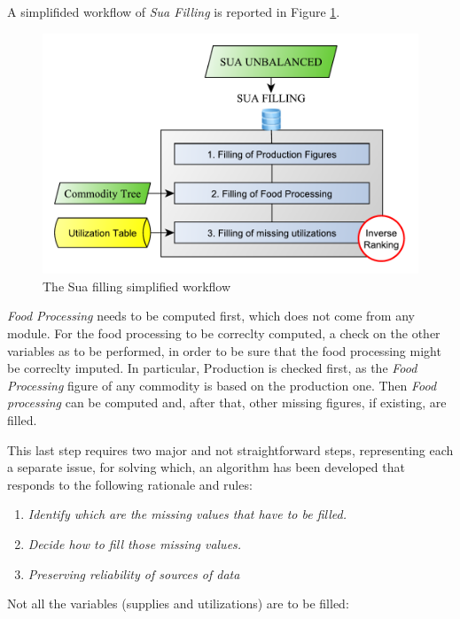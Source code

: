 \documentclass[]{article}
\providecommand{\tightlist}{%
  \setlength{\itemsep}{0pt}\setlength{\parskip}{0pt}}
\begin{document}
A simplifided workflow of \emph{Sua Filling} is reported in Figure
\ref{fig:f3}.

\begin{figure}[H]

{\centering \includegraphics[width=0.6\linewidth]{images/03_SuaFilling} 

}

\caption{\label{fig:f3}The Sua filling simplified workflow}\label{fig:f3}
\end{figure}

\emph{Food Processing} needs to be computed first, which does not come
from any module. For the food processing to be correclty computed, a
check on the other variables as to be performed, in order to be sure
that the food processing might be correclty imputed. In particular,
Production is checked first, as the \emph{Food Processing} figure of any
commodity is based on the production one. Then \emph{Food processing}
can be computed and, after that, other missing figures, if existing, are
filled.

This last step requires two major and not straightforward steps,
representing each a separate issue, for solving which, an algorithm has
been developed that responds to the following rationale and rules:

\begin{enumerate}
\def\labelenumi{\arabic{enumi}.}
\tightlist
\item
  \emph{Identify which are the missing values that have to be filled.}
\item
  \emph{Decide how to fill those missing values.}
\item
  \emph{Preserving reliability of sources of data}
\end{enumerate}

Not all the variables (supplies and utilizations) are to be filled:
\end{document}
